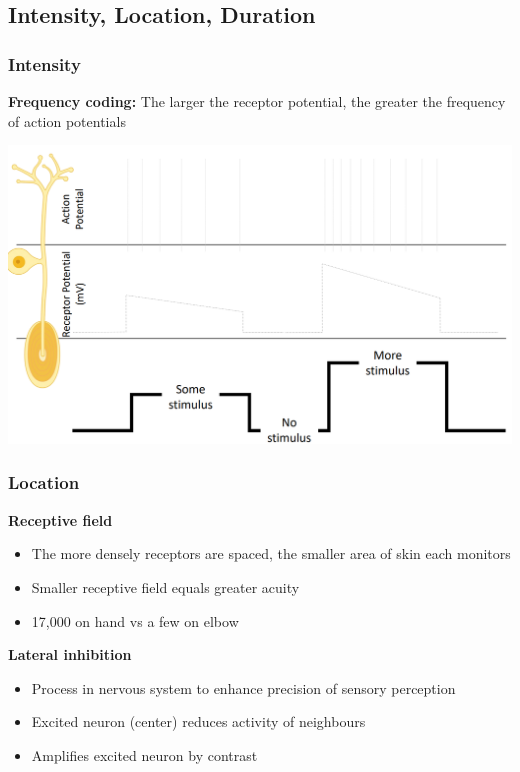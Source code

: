 \documentclass[11pt,fleqn]{book} %
\begin{document}
\subsection{Intensity, Location, Duration}
\subsubsection{Intensity}
\textbf{Frequency coding:} The larger the receptor potential, the greater the frequency of action potentials
\begin{center}
    \includegraphics[width=0.65\linewidth]{Pictures/Screenshot 2024-03-06 194015.png}
\end{center}

\subsubsection{Location}
\textbf{Receptive field}
\begin{itemize}
    \item The more densely receptors are spaced, the smaller area of skin each monitors
    \item Smaller receptive field equals greater acuity
    \item 17,000 on hand vs a few on elbow
\end{itemize}
\textbf{Lateral inhibition}
\begin{itemize}
    \item Process in nervous system to enhance precision of sensory perception
    \item Excited neuron (center) reduces activity of neighbours
    \item Amplifies excited neuron by contrast
\end{itemize}
\end{document}
